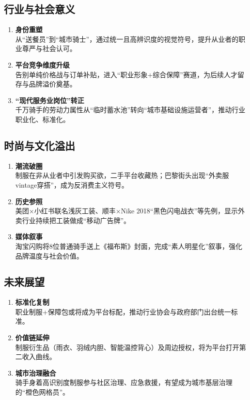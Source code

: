 \subsection{行业与社会意义}
\begin{enumerate}[leftmargin=*, nosep]
    \item \textbf{身份重塑}  \\
    从“送餐员”到“城市骑士”，通过统一且高辨识度的视觉符号，提升从业者的职业尊严与社会认可。
    \item \textbf{平台竞争维度升级}  \\
    告别单纯价格战与订单补贴，进入“职业形象+综合保障”赛道，为后续人才留存与品牌溢价奠基。
    \item \textbf{“现代服务业岗位”转正}  \\
    千万骑手的劳动力属性从“临时蓄水池”转向“城市基础设施运营者”，推动行业职业化、标准化。
\end{enumerate}

\subsection{时尚与文化溢出}
\begin{enumerate}[leftmargin=*, nosep]
    \item \textbf{潮流破圈}  \\
    制服在非从业者中引发购买欲，二手平台收藏热；巴黎街头出现“外卖服vintage穿搭”，成为反消费主义符号。  
    \item \textbf{历史参照}  \\
    美团×小红书联名浅灰工装、顺丰×Nike 2018“黑色闪电战衣”等先例，显示外卖行业持续把工装做成“移动广告牌”。
    \item \textbf{媒体叙事}  \\
    淘宝闪购将8位普通骑手送上《福布斯》封面，完成“素人明星化”叙事，强化品牌温度与社会价值。
\end{enumerate}

\subsection{未来展望}
\begin{enumerate}[leftmargin=*, nosep]
    \item \textbf{标准化复制}  \\
    职业制服+保障包或将成为平台标配，推动行业协会与政府部门出台统一标准。
    \item \textbf{价值链延伸}  \\
    制服衍生品（雨衣、羽绒内胆、智能温控背心）及周边授权，将为平台打开第二收入曲线。
    \item \textbf{城市治理融合}  \\
    骑手身着高识别度制服参与社区治理、应急救援，有望成为城市基层治理的“橙色网格员”。
\end{enumerate}



